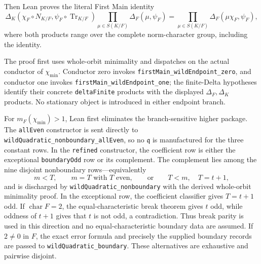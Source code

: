 \begin{theorem}
Then Lean proves the literal First Main identity
\[
 \Delta_K(\chi_F\circ N_{K/F},\psi_F\circ\operatorname{Tr}_{K/F})
 \prod_{\mu\in S(K/F)}\Delta_F(\mu,\psi_F)
 =
 \prod_{\mu\in S(K/F)}\Delta_F(\mu\chi_F,\psi_F),
\]
where both products range over the complete norm-character group, including
the identity.

The proof first uses whole-orbit minimality and dispatches on the actual
conductor of \(\chi_{\min}\).  Conductor zero invokes
\texttt{firstMain\_wildEndpoint\_zero}, and conductor one invokes
\texttt{firstMain\_wildEndpoint\_one}; the finite-Delta hypotheses identify
their concrete \texttt{deltaFinite} products with the displayed
\(\Delta_F,\Delta_K\) products.  No stationary object is introduced in
either endpoint branch.

For \(m_F(\chi_{\min})>1\), Lean first eliminates the branch-sensitive
higher package.  The \texttt{allEven} constructor is sent directly to
\texttt{wildQuadratic\_nonboundary\_allEven}, so no \(\mathfrak q\) is
manufactured for the three constant rows.  In the \texttt{refined}
constructor, the coefficient row is either the exceptional
\texttt{boundaryOdd} row or its complement.  The complement lies among the
nine disjoint nonboundary rows---equivalently
\[
 m<T,\qquad m=T\text{ with }T\text{ even},\qquad\text{or}\qquad T<m,
 \quad T=t+1,
\]
and is discharged by \texttt{wildQuadratic\_nonboundary} with the derived
whole-orbit minimality proof.  In the exceptional row, the coefficient
classifier gives \(T=t+1\) odd.  If \(\operatorname{char}F=2\), the
equal-characteristic break theorem gives \(t\) odd, while oddness of
\(t+1\) gives that \(t\) is not odd, a contradiction.  Thus break parity is
used in this direction and no equal-characteristic boundary data are
assumed.  If \(2\ne0\) in \(F\), the exact error formula and precisely the
supplied boundary records are passed to
\texttt{wildQuadratic\_boundary}.  These alternatives are exhaustive and
pairwise disjoint.


\end{theorem}
